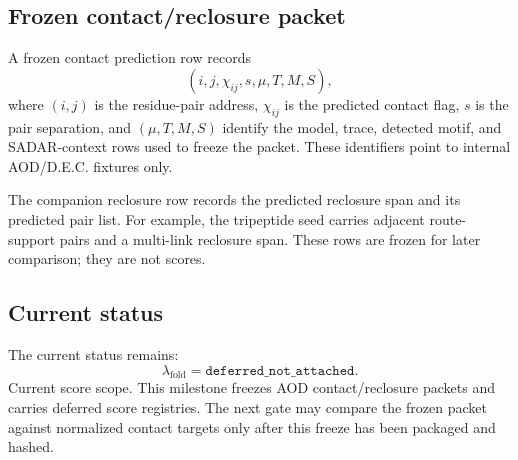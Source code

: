 \subsection{Frozen contact/reclosure packet}

A frozen contact prediction row records
\[
(i,j,\chi_{ij},s,\mu,T,M,S),
\]
where $(i,j)$ is the residue-pair address, $\chi_{ij}$ is the predicted contact flag, $s$ is the pair separation, and $(\mu,T,M,S)$ identify the model, trace, detected motif, and SADAR-context rows used to freeze the packet. These identifiers point to internal AOD/D.E.C. fixtures only.

The companion reclosure row records the predicted reclosure span and its predicted pair list. For example, the tripeptide seed carries adjacent route-support pairs and a multi-link reclosure span. These rows are frozen for later comparison; they are not scores.


\subsection{Current status}

The current status remains:
\[
\lambda_{\mathrm{fold}}=\texttt{deferred\_not\_attached}.
\]
Current score scope. This milestone freezes AOD contact/reclosure packets and carries deferred score registries. The next gate may compare the frozen packet against normalized contact targets only after this freeze has been packaged and hashed.
